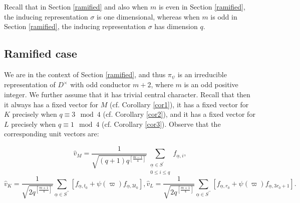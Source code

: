 \documentclass[12pt]{amsart}
\theoremstyle{definition}
\theoremstyle{remark}
\begin{document}
Recall that in Section \ref{ramified} and also when $m$ is even in Section \ref{ramified}, the inducing representation $\sigma$ is one dimensional, whereas when $m$ is odd in Section \ref{ramified}, the inducing representation $\sigma$ has dimension $q$.  

\subsection{Ramified case}

We are in the context of Section \ref{ramified}, and thus $\pi_\psi$ is an irreducible representation of $D^\times$ with odd conductor $m+2$, where $m$ is an odd positive integer. We further assume that it has trivial central character. Recall that then it always has a fixed vector for $M$ (cf. Corollary \ref{cor1}), it has a fixed vector for $K$ precisely when $q \equiv 3 \mod 4$ (cf. Corollary \ref{cor2}), and it has a fixed vector for $L$ precisely when $q \equiv 1 \mod 4$ (cf. Corollary \ref{cor3}). Observe that the corresponding unit vectors are:

\[\hat{v}_M =  \frac{1}{\sqrt{(q+1) q^{[\frac{m-1}{4}]}} } \sum\limits_{\substack{\underline{\alpha} \in S^\prime  \\    0 \leq i \leq q }} f_{\underline{\alpha}, i},\]
\[ \hat{v}_K = \frac{1}{\sqrt{2 q^{[\frac{m+1}{4}]}} }  \sum\limits_{\underline{\alpha} \in S^{\prime \prime} } \left[ f_{\underline{\alpha}, t_0} + \psi(\varpi) f_{\underline{\alpha}, 3t_0} \right], 
\hat{v}_L  =  \frac{1}{\sqrt{2 q^{[\frac{m+1}{4}]}} } \sum\limits_{\underline{\alpha} \in S^{\prime \prime} } \left[ f_{\underline{\alpha}, r_0} + \psi(\varpi) f_{\underline{\alpha}, 3r_0+1} \right].\]
\end{document}
